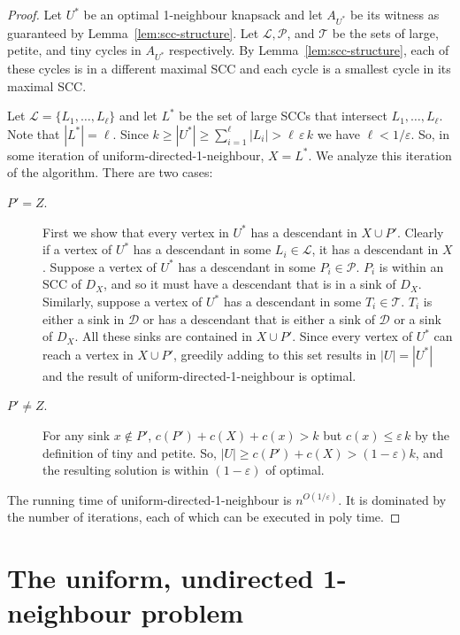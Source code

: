 \documentclass[12pt]{article}
\begin{document}
\begin{proof}
Let $U^*$ be an optimal 1-neighbour knapsack and let $A_{U^*}$ be
its witness as guaranteed by Lemma~\ref{lem:scc-structure}.
Let $\mathcal{L}, \mathcal{P}$, and $\mathcal{T}$ be the sets of large, petite, and tiny cycles in
$A_{U^*}$ respectively.   
By Lemma~\ref{lem:scc-structure}, each of these cycles is in a
different maximal SCC and each cycle is a smallest cycle in its
maximal SCC.

Let $\mathcal{L}=\{L_{1}, \ldots, L_{\ell} \}$ and let $L^*$ be the set of large SCCs that intersect $L_1,\ldots,
L_\ell$.  Note that $|L^*| = \ell$.  Since $k \geq |U^*| \geq
\sum_{i=1}^\ell |L_{i}| > \ell\, \varepsilon\, k$ we have $\ell < 1/\varepsilon$.
So, in some iteration of {\sc uniform-directed-1-neighbour}, $X =
L^*$.  We analyze this iteration of the algorithm.  There are two
cases:
\begin{description}
\item[$P'=Z$.] First we show that every vertex in $U^*$ has a descendant in $X \cup
P'$.  Clearly if a vertex of $U^*$ has a descendant in some $L_i \in \mathcal{L}$, it has
a descendant in $X$.  Suppose a vertex of $U^*$ has a descendant in
some $P_i \in \mathcal{P}$.  $P_i$ is within an SCC of $D_X$, and so it must have a
descendant that is in a sink of $D_X$.  Similarly, suppose a vertex of $U^{*}$
has a descendant in some $T_{i} \in \mathcal{T}$.  $T_{i}$ is either a sink in $\mathcal{D}$ or has a
descendant that is either a sink of $\mathcal{D}$ or a sink of $D_{X}$.
All these sinks are contained in $X \cup P'$. Since every vertex of $U^*$ can reach a
vertex in $X \cup P'$, greedily adding to
this set results in $|U| = |U^*|$ and the result of {\sc
uniform-directed-1-neighbour} is optimal.

\item[$P' \neq Z$.]For any sink $x \notin P'$, $c(P')+c(X)+c(x) > k$ but $c(x)
\leq \varepsilon\, k$ by the definition of tiny and petite.  So, $|U| \geq
c(P')+c(X) > (1-\varepsilon) k$, and the resulting solution is within
$(1-\varepsilon)$ of optimal.
\end{description}

The running time of {\sc uniform-directed-1-neighbour} is
$n^{O(1/\varepsilon)}$.  It is dominated by the number of iterations,
each of which can be executed in poly time. \hfill  \end{proof}


\section{The uniform, undirected 1-neighbour  problem} \label{sec:uu1n}
\end{document}

